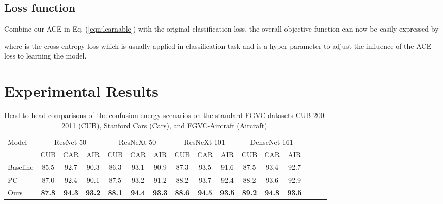 \documentclass{article}
\begin{document}
\subsection{Loss function}


Combine our ACE in Eq. (\ref{eqn:learnable}) with the original classification loss, the overall objective function can now be easily expressed by
\begin{linenomath}

\end{linenomath}
\noindent where  is the cross-entropy loss which is usually applied in classification task and  is a hyper-parameter to adjust the influence of the ACE loss to learning the model.

\section{Experimental Results}
\label{sec:result}


\begin{table*}[ht!]
\caption{Head-to-head comparisons of the confusion energy scenarios on the standard FGVC datasets CUB-200-2011 (CUB), Stanford Cars (Cars), and FGVC-Aircraft (Aircraft).}
\label{tab:fgvc_ab}
\centering
\begin{tabular}{lccccccccccccccc}
\toprule
\multirow{2}{*}{Model} & \multicolumn{3}{c}{ResNet-50} & \multicolumn{3}{c}{ResNeXt-50} & \multicolumn{3}{c}{ResNeXt-101} & \multicolumn{3}{c}{DenseNet-161}\\
        \cmidrule(lr){2-4}
        \cmidrule(lr){5-7}
        \cmidrule(lr){8-10}
        \cmidrule(lr){11-13}
        \cmidrule(lr){14-16}
                    & CUB  & CAR  & AIR  & CUB  & CAR  & AIR  & CUB  & CAR  & AIR & CUB  & CAR  & AIR \\
        \midrule
        \midrule
        Baseline    & 85.5 & 92.7 & 90.3 & 86.3 & 93.1 & 90.9 & 87.3 & 93.5 & 91.6 & 87.5 & 93.4 & 92.7 \\
        PC          & 87.0 & 92.4 & 90.1 & 87.5 & 93.2 & 91.2 & 88.2 & 93.7 & 92.4 & 88.2 & 93.6 & 92.9 \\
        \midrule
        \midrule
        Ours        & \bf 87.8 & \bf 94.3 & \bf 93.2 & \bf 88.1 & \bf 94.4 & \bf 93.3 & \bf 88.6 & \bf 94.5 & \bf 93.5 & \bf 89.2 & \bf 94.8 & \bf 93.5 \\
        \bottomrule
\end{tabular}
\vspace{-5pt}
\end{table*}
\end{document}
